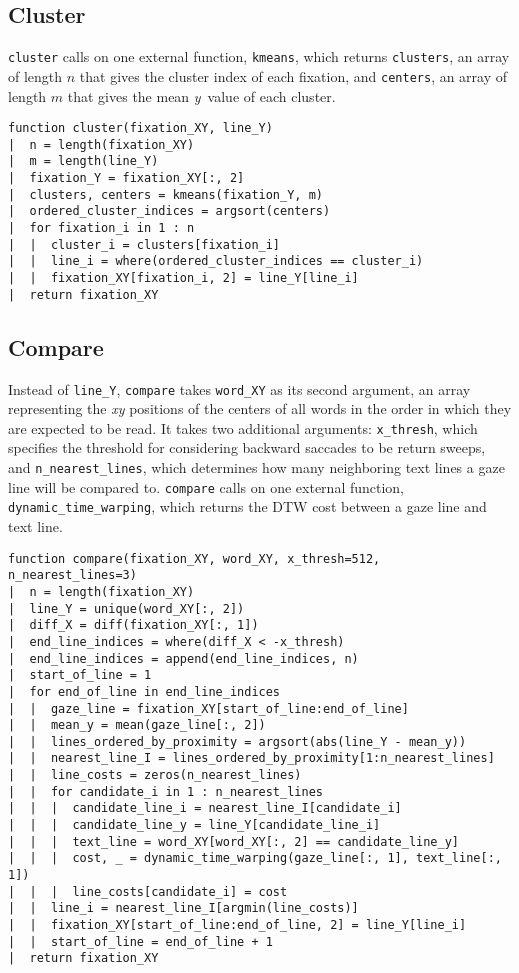 \documentclass[doc,biblatex]{apa7}
\begin{document}
\subsection{Cluster}

\noindent
\texttt{cluster} calls on one external function, \texttt{kmeans}, which returns \texttt{clusters}, an array of length $n$ that gives the cluster index of each fixation, and \texttt{centers}, an array of length $m$ that gives the mean \textit{y}~value of each cluster.

\begin{verbatim}
function cluster(fixation_XY, line_Y)
|  n = length(fixation_XY)
|  m = length(line_Y)
|  fixation_Y = fixation_XY[:, 2]
|  clusters, centers = kmeans(fixation_Y, m)
|  ordered_cluster_indices = argsort(centers)
|  for fixation_i in 1 : n
|  |  cluster_i = clusters[fixation_i]
|  |  line_i = where(ordered_cluster_indices == cluster_i)
|  |  fixation_XY[fixation_i, 2] = line_Y[line_i]
|  return fixation_XY
\end{verbatim}

\subsection{Compare}

\noindent
Instead of \texttt{line\_Y}, \texttt{compare} takes \texttt{word\_XY} as its second argument, an array representing the \textit{xy} positions of the centers of all words in the order in which they are expected to be read. It takes two additional arguments: \texttt{x\_thresh}, which specifies the threshold for considering backward saccades to be return sweeps, and \texttt{n\_nearest\_lines}, which determines how many neighboring text lines a gaze line will be compared to. \texttt{compare} calls on one external function, \texttt{dynamic\_time\_warping}, which returns the DTW cost between a gaze line and text line.

\begin{verbatim}
function compare(fixation_XY, word_XY, x_thresh=512,  n_nearest_lines=3)
|  n = length(fixation_XY)
|  line_Y = unique(word_XY[:, 2])
|  diff_X = diff(fixation_XY[:, 1])
|  end_line_indices = where(diff_X < -x_thresh)
|  end_line_indices = append(end_line_indices, n)
|  start_of_line = 1
|  for end_of_line in end_line_indices
|  |  gaze_line = fixation_XY[start_of_line:end_of_line]
|  |  mean_y = mean(gaze_line[:, 2])
|  |  lines_ordered_by_proximity = argsort(abs(line_Y - mean_y))
|  |  nearest_line_I = lines_ordered_by_proximity[1:n_nearest_lines]
|  |  line_costs = zeros(n_nearest_lines)
|  |  for candidate_i in 1 : n_nearest_lines
|  |  |  candidate_line_i = nearest_line_I[candidate_i]
|  |  |  candidate_line_y = line_Y[candidate_line_i]
|  |  |  text_line = word_XY[word_XY[:, 2] == candidate_line_y]
|  |  |  cost, _ = dynamic_time_warping(gaze_line[:, 1], text_line[:, 1])
|  |  |  line_costs[candidate_i] = cost
|  |  line_i = nearest_line_I[argmin(line_costs)]
|  |  fixation_XY[start_of_line:end_of_line, 2] = line_Y[line_i]
|  |  start_of_line = end_of_line + 1
|  return fixation_XY
\end{verbatim}
\end{document}
